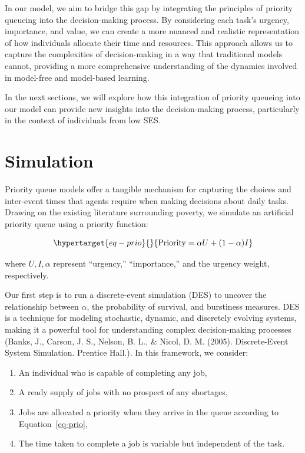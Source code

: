 \documentclass[
]{report}
\providecommand{\tightlist}{%
  \setlength{\itemsep}{0pt}\setlength{\parskip}{0pt}}\usepackage{longtable,booktabs,array}
\begin{document}
In our model, we aim to bridge this gap by integrating the principles of
priority queueing into the decision-making process. By considering each
task's urgency, importance, and value, we can create a more nuanced and
realistic representation of how individuals allocate their time and
resources. This approach allows us to capture the complexities of
decision-making in a way that traditional models cannot, providing a
more comprehensive understanding of the dynamics involved in model-free
and model-based learning.

In the next sections, we will explore how this integration of priority
queueing into our model can provide new insights into the
decision-making process, particularly in the context of individuals from
low SES.

\hypertarget{simulation}{%
\section{Simulation}\label{simulation}}

Priority queue models offer a tangible mechanism for capturing the
choices and inter-event times that agents require when making decisions
about daily tasks. Drawing on the existing literature surrounding
poverty, we simulate an artificial priority queue using a priority
function:

\begin{equation}\protect\hypertarget{eq-prio}{}{
\text{Priority} = \alpha U + (1- \alpha) I
}\label{eq-prio}\end{equation}

where \(U, I, \alpha\) represent ``urgency,'' ``importance,'' and the
urgency weight, respectively.

Our first step is to run a discrete-event simulation (DES) to uncover
the relationship between \(\alpha\), the probability of survival, and
burstiness measures. DES is a technique for modeling stochastic,
dynamic, and discretely evolving systems, making it a powerful tool for
understanding complex decision-making processes (Banks, J., Carson, J.
S., Nelson, B. L., \& Nicol, D. M. (2005). Discrete-Event System
Simulation. Prentice Hall.). In this framework, we consider:

\begin{enumerate}
\def\labelenumi{\arabic{enumi}.}
\tightlist
\item
  An individual who is capable of completing any job,
\item
  A ready supply of jobs with no prospect of any shortages,
\item
  Jobs are allocated a priority when they arrive in the queue according
  to Equation~\ref{eq-prio},
\item
  The time taken to complete a job is variable but independent of the
  task.
\end{enumerate}
\end{document}

